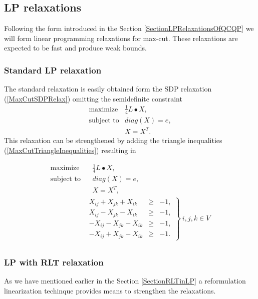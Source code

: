 \documentclass[12pt]{book}
\theoremstyle{definition}
\begin{document}
\subsection{LP relaxations}
Following the form introduced in the Section \ref{SectionLPRelaxationsOfQCQP} we will form linear programming relaxations for max-cut. These relaxations are expected to be fast and produce weak bounds.

\subsubsection{Standard LP relaxation}
The standard relaxation is easily obtained form the SDP relaxation (\ref{MaxCutSDPRelax}) omitting the semidefinite constraint
\begin{equation}
\label{MaxCutLPRelaxStandard}
\begin{array}{ll}
\mbox{maximize} & \frac{1}{4}L\bullet X, \\
\mbox{subject to} & diag(X) = e ,\\
&	X=X^T.
\end{array}
\end{equation} 
This relaxation can be strengthened by adding the triangle inequalities (\ref{MaxCutTriangleInequalities}) resulting in 

\begin{equation}
\label{MaxCutLPRelaxTriag}
\begin{array}{ll}
\mbox{maximize} & \  \ \ \ \frac{1}{4}L\bullet X, \\
\mbox{subject to} &\ \ \ \ diag(X) = e, \\
&\ \ \	\ X=X^T ,\\
& \left.\begin{array}{rcl}
X_{ij} + X_{jk} + X_{ik} &\geq & -1, \\
X_{ij} - X_{jk} - X_{ik} &\geq & -1, \\
- X_{ij} - X_{jk} - X_{ik} &\geq & -1, \\
- X_{ij} + X_{jk} - X_{ik} &\geq & -1.
\end{array}\right\rbrace \ i,j,k \in V \\
\end{array}
\end{equation} 

\subsubsection{LP with RLT relaxation} 
As we have mentioned earlier in the Section \ref{SectionRLTinLP} a reformulation linearization techinque provides means to strengthen the relaxations. 
\end{document}
